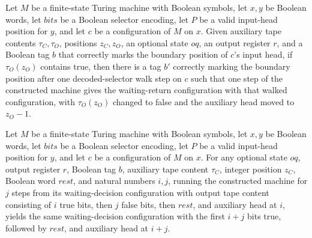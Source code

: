 \begin{theorem}
\label{Complexity.Meyer.wdec_fire}
\leanok
{}
Let $M$ be a finite-state Turing machine with Boolean symbols, let $x,y$ be Boolean
words, let $bits$ be a Boolean selector encoding, let $P$ be a valid input-head position
for $y$, and let $c$ be a configuration of $M$ on $x$. Given auxiliary tape contents
$\tau_C,\tau_O$, positions $z_C,z_O$, an optional state $oq$, an output register $r$,
and a Boolean tag $b$ that correctly marks the boundary position of $c$'s input head, if
$\tau_O(z_O)$ contains true, then there is a tag $b'$ correctly marking the boundary
position after one decoded-selector walk step on $c$ such that one step of the
constructed machine gives the waiting-return configuration with that walked
configuration, with $\tau_O(z_O)$ changed to false and the auxiliary head moved to
$z_O-1$.
\end{theorem}

\begin{theorem}
\label{Complexity.Meyer.wdec_sweep}
\leanok
{}
Let $M$ be a finite-state Turing machine with Boolean symbols, let $x,y$ be Boolean
words, let $bits$ be a Boolean selector encoding, let $P$ be a valid input-head position
for $y$, and let $c$ be a configuration of $M$ on $x$. For any optional state $oq$,
output register $r$, Boolean tag $b$, auxiliary tape content $\tau_C$, integer position
$z_C$, Boolean word $rest$, and natural numbers $i,j$, running the constructed machine
for $j$ steps from its waiting-decision configuration with output tape content
consisting of $i$ true bits, then $j$ false bits, then $rest$, and auxiliary head at
$i$, yields the same waiting-decision configuration with the first $i+j$ bits true,
followed by $rest$, and auxiliary head at $i+j$.
\end{theorem}

